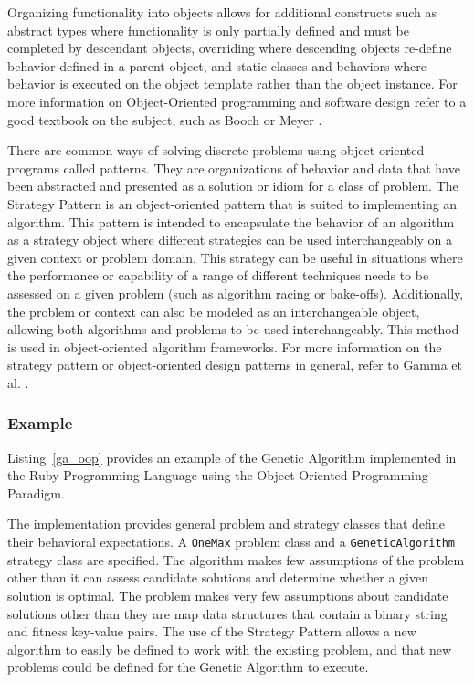 Organizing functionality into objects allows for additional constructs such as abstract types where functionality is only partially defined and must be completed by descendant objects, overriding where descending objects re-define behavior defined in a parent object, and static classes and behaviors where behavior is executed on the object template rather than the object instance. 
For more information on Object-Oriented programming and software design refer to a good textbook on the subject, such as Booch \cite{Booch1997} or Meyer \cite{Meyer1997}.

There are common ways of solving discrete problems using object-oriented programs called patterns. They are organizations of behavior and data that have been abstracted and presented as a solution or idiom for a class of problem. The Strategy Pattern is an object-oriented pattern that is suited to implementing an algorithm. This pattern is intended to encapsulate the behavior of an algorithm as a strategy object where different strategies can be used interchangeably on a given context or problem domain. This strategy can be useful in situations where the performance or capability of a range of different techniques needs to be assessed on a given problem (such as algorithm racing or bake-offs). Additionally, the problem or context can also be modeled as an interchangeable object, allowing both algorithms and problems to be used interchangeably. This method is used in object-oriented algorithm frameworks.
For more information on the strategy pattern or object-oriented design patterns in general, refer to Gamma et al. \cite{Gamma1995}.

\subsubsection{Example}
Listing~\ref{ga_oop} provides an example of the Genetic Algorithm implemented in the Ruby Programming Language using the Object-Oriented Programming Paradigm. 

The implementation provides general problem and strategy classes that define their behavioral expectations. A \texttt{One\-Max} problem class and a \texttt{Genetic\-Algorithm} strategy class are specified. The algorithm makes few assumptions of the problem other than it can assess candidate solutions and determine whether a given solution is optimal. The problem makes very few assumptions about candidate solutions other than they are map data structures that contain a binary string and fitness key-value pairs. The use of the Strategy Pattern allows a new algorithm to easily be defined to work with the existing problem, and that new problems could be defined for the Genetic Algorithm to execute.

